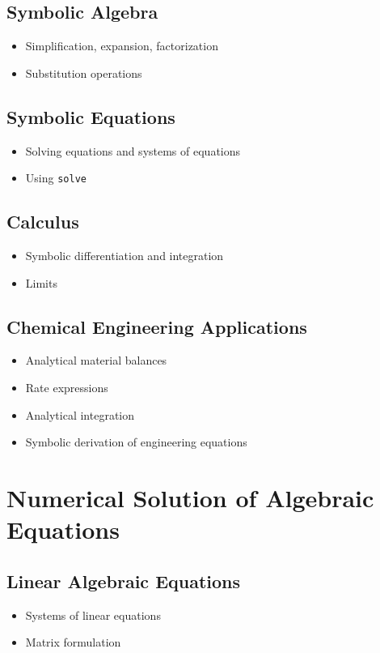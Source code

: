 \documentclass[11pt, a4paper]{article}
\begin{document}
\subsection{Symbolic Algebra}
\begin{itemize}
  \item Simplification, expansion, factorization
  \item Substitution operations
\end{itemize}

\subsection{Symbolic Equations}
\begin{itemize}
  \item Solving equations and systems of equations
  \item Using \texttt{solve}
\end{itemize}

\subsection{Calculus}
\begin{itemize}
  \item Symbolic differentiation and integration
  \item Limits
\end{itemize}

\subsection{Chemical Engineering Applications}
\begin{itemize}
  \item Analytical material balances
  \item Rate expressions
  \item Analytical integration
  \item Symbolic derivation of engineering equations
\end{itemize}

\section{Numerical Solution of Algebraic Equations}

\subsection{Linear Algebraic Equations}
\begin{itemize}
  \item Systems of linear equations
  \item Matrix formulation
\end{itemize}
\end{document}
